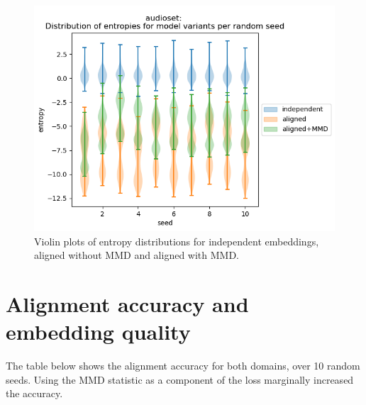 \begin{figure}[H]
    \centering
    \includegraphics[width=\textwidth]{images/results/audioset_entropies_violin.png}
    \caption{
        Violin plots of entropy distributions for independent embeddings, aligned without MMD and aligned with MMD. 
    }
\end{figure}

\section{Alignment accuracy and embedding quality}

The table below shows the alignment accuracy for both domains, over 10 random seeds. Using the MMD statistic as a component of the loss marginally increased the accuracy. 

